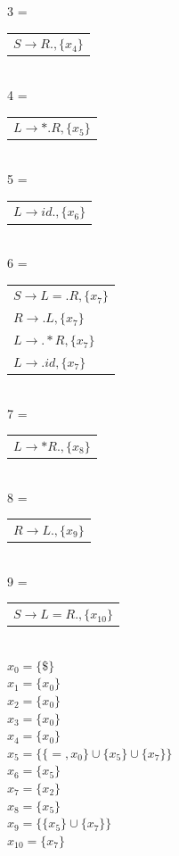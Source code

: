 3 = 
\begin{tabular}{l}
	$S \rightarrow R., \{ x_4 \}$\\
\end{tabular}\\[5pt]

4 = 
\begin{tabular}{l}
	$L \rightarrow *.R, \{ x_5 \}$\\
\end{tabular}\\[5pt]

5 = 
\begin{tabular}{l}
	$L \rightarrow id., \{ x_6 \}$\\
\end{tabular}\\[5pt]

6 = 
\begin{tabular}{l}
	$S \rightarrow L = .R, \{ x_7 \}$\\
	$R \rightarrow .L, \{ x_7 \}$\\
	$L \rightarrow .*R, \{ x_7 \}$\\
	$L \rightarrow .id, \{ x_7 \}$\\
\end{tabular}\\[5pt]

7 = 
\begin{tabular}{l}
	$L \rightarrow *R., \{ x_8 \}$\\
\end{tabular}\\[5pt]

8 = 
\begin{tabular}{l}
	$R \rightarrow L., \{ x_9 \}$\\
\end{tabular}\\[5pt]

9 = 
\begin{tabular}{l}
	$S \rightarrow L = R., \{ x_{10} \}$\\
\end{tabular}\\[5pt]

$x_0 = \{ \$ \}$ \\
$x_1 = \{ x_0 \}$ \\
$x_2 = \{ x_0 \}$ \\
$x_3 = \{ x_0 \}$ \\
$x_4 = \{ x_0 \}$ \\
$x_5 = \{ \{ =, x_0 \} \cup \{ x_5 \} \cup \{ x_7 \} \}$  \\
$x_6 = \{ x_5 \}$ \\
$x_7 = \{ x_2 \}$ \\
$x_8 = \{ x_5 \}$ \\
$x_9 = \{ \{x_5\} \cup \{ x_7\} \}$ \\
$x_{10} = \{ x_7 \}$ \\

